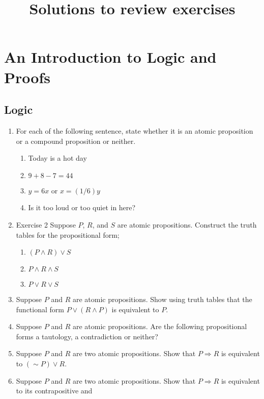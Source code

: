 \documentclass[10pt]{article}
\title{Solutions to review exercises}
\date{}
\renewcommand{\textit}{}
\begin{document}
\maketitle

\section{An Introduction to Logic and Proofs}

\subsection{Logic}
\renewcommand{\labelenumi}{\textbf{Exercise \arabic{enumi}}}
\renewcommand{\labelenumii}{\roman{enumii}}
\begin{enumerate}
\item \textit{For each of the following sentence, state whether it is an atomic
proposition or a compound proposition or neither.}
\begin{enumerate}
\item \textit{Today is a hot day} 
\item \textit{$9+8-7=44$} 
\item \textit{$y = 6x$ or $x = (1/6)y$} 
\item \textit{Is it too loud or too quiet
    in here?} 
\end{enumerate}
\item \textit{Exercise 2 Suppose $P$, $R$, and $S$ are atomic propositions. Construct the
truth tables for the propositional form;} 
\begin{enumerate}
  \item $(P \wedge R) \vee S$
  \item $P \wedge R \wedge S$ 
  \item $P \vee R \vee S$
  \end{enumerate}
\item \textit{Suppose $P$ and $R$ are atomic propositions. Show using truth
    tables that the functional form $P \vee (R \wedge P)$ is
    equivalent to $P$.}
\item \textit{Suppose $P$ and $R$ are atomic propositions. Are the following
    propositional forms a tautology, a contradiction or neither?}
\item \textit{Suppose $P$ and $R$ are two atomic propositions. Show that
    $P \Rightarrow R$ is equivalent to $(\sim P) \vee R$.} 
\item \textit{Suppose $P$ and $R$ are two atomic propositions. Show
    that $P \Rightarrow R$ is equivalent to its contrapositive and
}
\end{enumerate}
\end{document}
